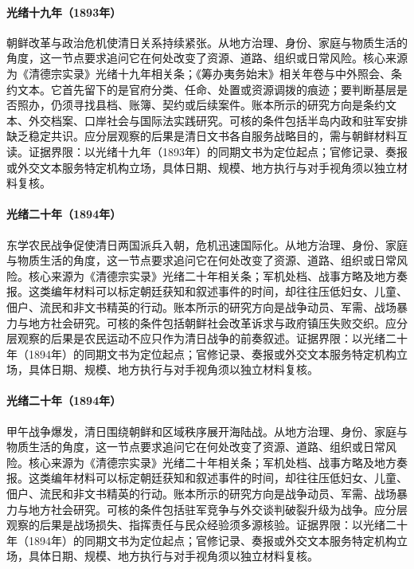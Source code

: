 \hypertarget{social:EQ-1893-KOREAN-REFORM-CRISIS}{}\paragraph{光绪十九年（1893年）}朝鲜改革与政治危机使清日关系持续紧张。从地方治理、身份、家庭与物质生活的角度，这一节点要求追问它在何处改变了资源、道路、组织或日常风险。核心来源为《清德宗实录》光绪十九年相关条；《筹办夷务始末》相关年卷与中外照会、条约文本。它首先留下的是官府分类、任命、处置或资源调拨的痕迹；要判断基层是否照办，仍须寻找县档、账簿、契约或后续案件。账本所示的研究方向是条约文本、外交档案、口岸社会与国际法实践研究。可核的条件包括半岛内政和驻军安排缺乏稳定共识。应分层观察的后果是清日文书各自服务战略目的，需与朝鲜材料互读。证据界限：以光绪十九年（1893年）的同期文书为定位起点；官修记录、奏报或外交文本服务特定机构立场，具体日期、规模、地方执行与对手视角须以独立材料复核。
\hypertarget{social:EQ-1894-DONGHAK-PEASANT-WAR}{}\paragraph{光绪二十年（1894年）}东学农民战争促使清日两国派兵入朝，危机迅速国际化。从地方治理、身份、家庭与物质生活的角度，这一节点要求追问它在何处改变了资源、道路、组织或日常风险。核心来源为《清德宗实录》光绪二十年相关条；军机处档、战事方略及地方奏报。这类编年材料可以标定朝廷获知和叙述事件的时间，却往往压低妇女、儿童、佃户、流民和非文书精英的行动。账本所示的研究方向是战争动员、军需、战场暴力与地方社会研究。可核的条件包括朝鲜社会改革诉求与政府镇压失败交织。应分层观察的后果是农民运动不应只作为清日战争的前奏叙述。证据界限：以光绪二十年（1894年）的同期文书为定位起点；官修记录、奏报或外交文本服务特定机构立场，具体日期、规模、地方执行与对手视角须以独立材料复核。
\hypertarget{social:EQ-1894-FIRST-SINO-JAPANESE-WAR}{}\paragraph{光绪二十年（1894年）}甲午战争爆发，清日围绕朝鲜和区域秩序展开海陆战。从地方治理、身份、家庭与物质生活的角度，这一节点要求追问它在何处改变了资源、道路、组织或日常风险。核心来源为《清德宗实录》光绪二十年相关条；军机处档、战事方略及地方奏报。这类编年材料可以标定朝廷获知和叙述事件的时间，却往往压低妇女、儿童、佃户、流民和非文书精英的行动。账本所示的研究方向是战争动员、军需、战场暴力与地方社会研究。可核的条件包括驻军竞争与外交谈判破裂升级为战争。应分层观察的后果是战场损失、指挥责任与民众经验须多源核验。证据界限：以光绪二十年（1894年）的同期文书为定位起点；官修记录、奏报或外交文本服务特定机构立场，具体日期、规模、地方执行与对手视角须以独立材料复核。

